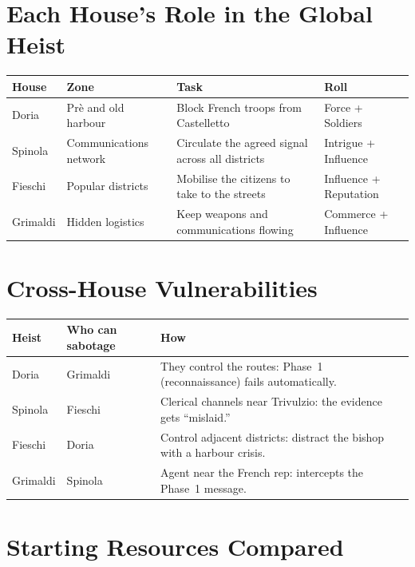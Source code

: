 \section{Each House's Role in the Global Heist}
\label{sec:ref-roles}

\begin{center}
\begin{tabularx}{\textwidth}{L{2.2cm} L{3cm} X L{3.2cm}}
  \toprule
  \textbf{House} & \textbf{Zone} & \textbf{Task} & \textbf{Roll} \\
  \midrule
  Doria    & Prè and old harbour     & Block French troops from Castelletto & Force + Soldiers \\
  Spinola  & Communications network  & Circulate the agreed signal across all districts & Intrigue + Influence \\
  Fieschi  & Popular districts       & Mobilise the citizens to take to the streets & Influence + Reputation \\
  Grimaldi & Hidden logistics        & Keep weapons and communications flowing & Commerce + Influence \\
  \bottomrule
\end{tabularx}
\end{center}

\section{Cross-House Vulnerabilities}
\label{sec:ref-vulnerabilities}

\begin{center}
\begin{tabular}{L{2.5cm} L{2.5cm} p{8.5cm}}
  \toprule
  \textbf{Heist} & \textbf{Who can sabotage} & \textbf{How} \\
  \midrule
  Doria   & Grimaldi & They control the routes: Phase~1 (reconnaissance) fails automatically. \\
  Spinola & Fieschi  & Clerical channels near Trivulzio: the evidence gets ``mislaid.'' \\
  Fieschi & Doria    & Control adjacent districts: distract the bishop with a harbour crisis. \\
  Grimaldi& Spinola  & Agent near the French rep: intercepts the Phase~1 message. \\
  \bottomrule
\end{tabular}
\end{center}

\section{Starting Resources Compared}
\label{sec:ref-resources}

